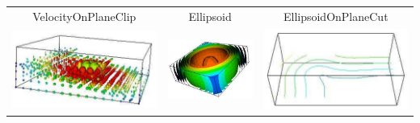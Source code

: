 \begin{table}[h]
\begin{tabular}{c c c}
VelocityOnPlaneClip & Ellipsoid & EllipsoidOnPlaneCut \\
\includegraphics[width=\thumbnailwidth]{figures/EllipsoidOnPlaneClip} & 
\includegraphics[width=\thumbnailwidth]{figures/Contour} & 
\includegraphics[width=\thumbnailwidth]{figures/ContourOnPlaneCut}  \\

\end{tabular}
\end{table}
